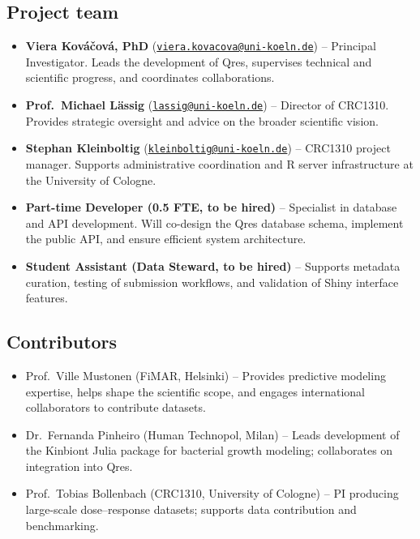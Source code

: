 \documentclass[
]{article}
\providecommand{\tightlist}{%
  \setlength{\itemsep}{0pt}\setlength{\parskip}{0pt}}
\begin{document}
\subsection{Project team}\label{project-team}

\begin{itemize}
\tightlist
\item
  \textbf{Viera Kováčová, PhD}
  (\href{mailto:viera.kovacova@uni-koeln.de}{\nolinkurl{viera.kovacova@uni-koeln.de}})
  -- Principal Investigator. Leads the development of Qres, supervises
  technical and scientific progress, and coordinates collaborations.\\
\item
  \textbf{Prof.~Michael Lässig}
  (\href{mailto:lassig@uni-koeln.de}{\nolinkurl{lassig@uni-koeln.de}})
  -- Director of CRC1310. Provides strategic oversight and advice on the
  broader scientific vision.\\
\item
  \textbf{Stephan Kleinboltig}
  (\href{mailto:kleinboltig@uni-koeln.de}{\nolinkurl{kleinboltig@uni-koeln.de}})
  -- CRC1310 project manager. Supports administrative coordination and R
  server infrastructure at the University of Cologne.\\
\item
  \textbf{Part-time Developer (0.5 FTE, to be hired)} -- Specialist in
  database and API development. Will co-design the Qres database schema,
  implement the public API, and ensure efficient system architecture.\\
\item
  \textbf{Student Assistant (Data Steward, to be hired)} -- Supports
  metadata curation, testing of submission workflows, and validation of
  Shiny interface features.
\end{itemize}

\subsection{Contributors}\label{contributors}

\begin{itemize}
\tightlist
\item
  Prof.~Ville Mustonen (FiMAR, Helsinki) -- Provides predictive modeling
  expertise, helps shape the scientific scope, and engages international
  collaborators to contribute datasets.
\item
  Dr.~Fernanda Pinheiro (Human Technopol, Milan) -- Leads development of
  the Kinbiont Julia package for bacterial growth modeling; collaborates
  on integration into Qres.
\item
  Prof.~Tobias Bollenbach (CRC1310, University of Cologne) -- PI
  producing large-scale dose--response datasets; supports data
  contribution and benchmarking.
\end{itemize}
\end{document}
